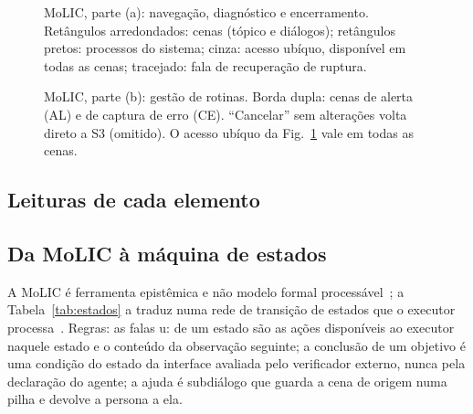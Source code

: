 \documentclass[conference,onecolumn]{IEEEtran}
\begin{document}
\begin{figure}
\centering

\caption{MoLIC, parte (a): navegação, diagnóstico e encerramento. Retângulos arredondados: cenas (tópico e diálogos); retângulos pretos: processos do sistema; cinza: acesso ubíquo, disponível em todas as cenas; tracejado: fala de recuperação de ruptura.}
\label{fig:molic-a}
\end{figure}

\begin{figure}[!t]
\centering

\caption{MoLIC, parte (b): gestão de rotinas. Borda dupla: cenas de alerta (AL) e de captura de erro (CE). ``Cancelar'' sem alterações volta direto a S3 (omitido). O acesso ubíquo da Fig.~\ref{fig:molic-a} vale em todas as cenas.}
\label{fig:molic-b}
\end{figure}

\subsection{Leituras de cada elemento}
\begin{table}[!h]
\caption{Leituras de cada elemento da MoLIC}
\label{tab:leituras}
\centering
\footnotesize

\end{table}

\subsection{Da MoLIC à máquina de estados}
A MoLIC é ferramenta epistêmica e não modelo formal processável~\cite{barbosa2010}; a Tabela~\ref{tab:estados} a traduz numa rede de transição de estados que o executor processa~\cite[cap.~16]{dix2004}. Regras: as falas u: de um estado são as ações disponíveis ao executor naquele estado e o conteúdo da observação seguinte; a conclusão de um objetivo é uma condição do estado da interface avaliada pelo verificador externo, nunca pela declaração do agente; a ajuda é subdiálogo que guarda a cena de origem numa pilha e devolve a persona a ela.

\begin{table}[!h]
\caption{Máquina de estados da interação (UA: acesso ubíquo, disponível em todos os estados exceto diálogos modais)}
\label{tab:estados}
\centering
\scriptsize

\end{table}

\end{document}
